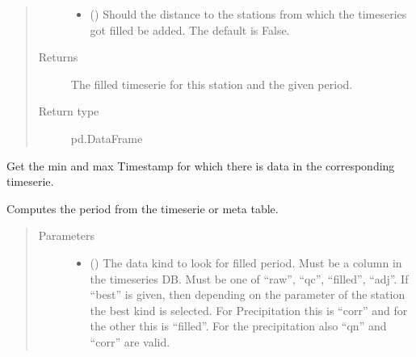 \documentclass[letterpaper,10pt,english]{sphinxmanual}
\begin{document}
\begin{fulllineitems}
\begin{fulllineitems}
\begin{quote}
\begin{description}
\begin{itemize}
\item {} 
\sphinxAtStartPar
{} (\sphinxstyleliteralemphasis{\sphinxupquote{, }}) \textendash{} Should the distance to the stations from which the timeseries got filled be added.
The default is False.

\end{itemize}

\item[{Returns}] \leavevmode
\sphinxAtStartPar
The filled timeserie for this station and the given period.

\item[{Return type}] \leavevmode
\sphinxAtStartPar
pd.DataFrame

\end{description}\end{quote}

\end{fulllineitems}


\begin{fulllineitems}
\label{\detokenize{weatherDB:weatherDB.station.StationBase.get_filled_period}}
\sphinxAtStartPar
Get the min and max Timestamp for which there is data in the corresponding timeserie.

\sphinxAtStartPar
Computes the period from the timeserie or meta table.
\begin{quote}\begin{description}
\item[{Parameters}] \leavevmode\begin{itemize}
\item {} 
\sphinxAtStartPar
{} () \textendash{} The data kind to look for filled period.
Must be a column in the timeseries DB.
Must be one of “raw”, “qc”, “filled”, “adj”.
If “best” is given, then depending on the parameter of the station the best kind is selected.
For Precipitation this is “corr” and for the other this is “filled”.
For the precipitation also “qn” and “corr” are valid.


\end{itemize}
\end{description}
\end{quote}
\end{fulllineitems}
\end{fulllineitems}
\end{document}
